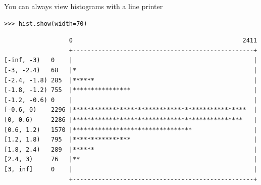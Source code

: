 \documentclass[aspectratio=169]{beamer}
\begin{document}
\begin{frame}[fragile]{You can always view histograms with a line printer}
\vspace{0.1 cm}
\small
\begin{verbatim}
>>> hist.show(width=70)
\end{verbatim}
\begin{verbatim}
                  0                                               2411
                  +--------------------------------------------------+
[-inf, -3)   0    |                                                  |
[-3, -2.4)   68   |*                                                 |
[-2.4, -1.8) 285  |******                                            |
[-1.8, -1.2) 755  |****************                                  |
[-1.2, -0.6) 0    |                                                  |
[-0.6, 0)    2296 |************************************************  |
[0, 0.6)     2286 |***********************************************   |
[0.6, 1.2)   1570 |*********************************                 |
[1.2, 1.8)   795  |****************                                  |
[1.8, 2.4)   289  |******                                            |
[2.4, 3)     76   |**                                                |
[3, inf]     0    |                                                  |
                  +--------------------------------------------------+
\end{verbatim}
\end{frame}
\end{document}
